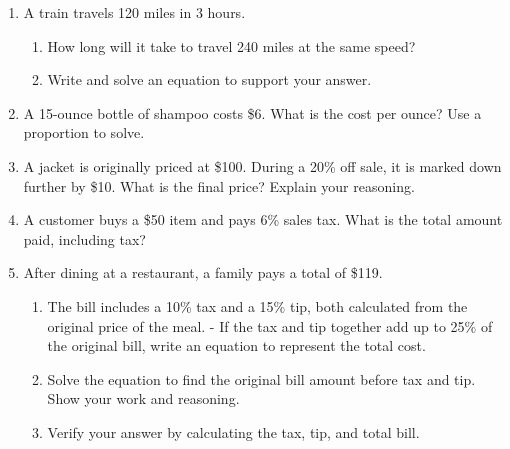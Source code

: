 \documentclass[12pt]{article}
\begin{document}
\vspace{1em}
\begin{tcolorbox}[colframe=black!60, colback=white, 
coltitle=black, colbacktitle=black!15, fonttitle=\bfseries\Large, 
title=Problems, halign title=center, left=10pt, right=10pt, top=10pt, bottom=100pt]
\begin{enumerate}[start=9, itemsep=5em]
    \item A train travels 120 miles in 3 hours.  
    \begin{enumerate}[label=(\alph*)]
        \item How long will it take to travel 240 miles at the same speed?  
        \item Write and solve an equation to support your answer.  
    \end{enumerate}
    \item A 15-ounce bottle of shampoo costs \$6. What is the cost per ounce? Use a proportion to solve. 
    \item A jacket is originally priced at \$100. During a 20\% off sale, it is marked down further by \$10. What is the final price? Explain your reasoning.  

    \item A customer buys a \$50 item and pays 6\% sales tax. What is the total amount paid, including tax?  

    \item After dining at a restaurant, a family pays a total of \$119.  
    \begin{enumerate}[label=(\alph*)]
        \item The bill includes a 10\% tax and a 15\% tip, both calculated from the original price of the meal.  
        - If the tax and tip together add up to 25\% of the original bill, write an equation to represent the total cost.  
        \item Solve the equation to find the original bill amount before tax and tip. Show your work and reasoning.  
        \item Verify your answer by calculating the tax, tip, and total bill.  
    \end{enumerate}

\end{enumerate}
\end{tcolorbox}
\end{document}
